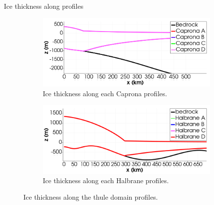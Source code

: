 \documentclass[11pt]{beamer}
\begin{document}
		\begin{frame}{Ice thickness along profiles}
				\begin{figure}
				\centering
				\begin{subfigure}{.5\textwidth}
					\centering
					\includegraphics[width=1\linewidth]{../fig/Capronas_Thule_Domain_con_fondo.png}
					\caption{Ice thickness along each Caprona profiles.}
					\label{Capronas_thule}
				\end{subfigure}%
				\begin{subfigure}{.5\textwidth}
					\centering
					\includegraphics[width=1\linewidth]{../fig/Halbranes_thule_domain_con_fondo.png}
					\caption{Ice thickness along each Halbrane profiles.}
					\label{Halbranes_thule}
				\end{subfigure}
				\caption{Ice thickness along the thule domain profiles.}
				\label{Thule_profiles_capronas_and_halbranes}
			\end{figure}
		\end{frame}
\end{document}
